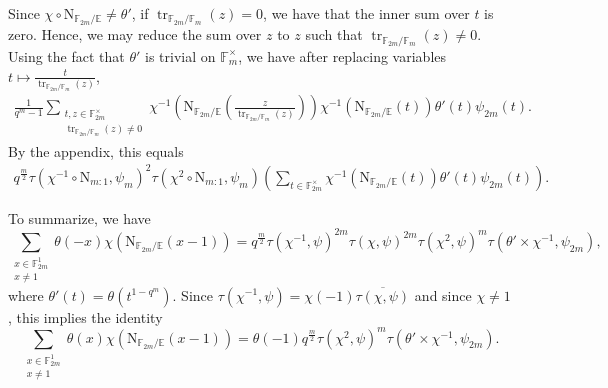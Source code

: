 \documentclass[12pt, reqno]{amsart}
\theoremstyle{definition}
\theoremstyle{definition}
\theoremstyle{definition}
\newcommand{\multiplicativegroup}[1]{#1^{\times}}
\newcommand{\conjugate}[1]{\overline{#1}}
\newcommand{\fieldCharacter}{\psi}
\newcommand{\trace}{\operatorname{tr}}
\newcommand{\FieldNorm}[2]{\mathrm{N}_{#1:#2}}
\newcommand{\aFieldNorm}{\mathrm{N}}
\newcommand{\finiteField}{\mathbb{F}}
\newcommand{\quadraticExtension}{\mathbb{E}}
\newcommand{\finiteFieldExtension}[1]{\finiteField_{#1}}
\begin{document}
Since $\chi \circ \aFieldNorm_{\finiteFieldExtension{2m} \slash \quadraticExtension} \ne \theta'$, if $\trace_{\finiteFieldExtension{2m} \slash \finiteFieldExtension{m}}\left(z\right) = 0$, we have that the inner sum over $t$ is zero. Hence, we may reduce the sum over $z$ to $z$ such that $\trace_{\finiteFieldExtension{2m} \slash \finiteFieldExtension{m}}\left(z\right) \ne 0$. Using the fact that $\theta'$ is trivial on $\multiplicativegroup{\finiteFieldExtension{m}}$, we have after replacing variables $t \mapsto \frac{t}{\trace_{\finiteFieldExtension{2m} \slash \finiteFieldExtension{m}}\left(z\right)}$,
\begin{align*}
	\frac{1}{q^m-1}\sum_{\substack{t,z \in \multiplicativegroup{\finiteFieldExtension{2m}}\\
	\trace_{\finiteFieldExtension{2m} \slash \finiteFieldExtension{m}}\left(z\right) \ne 0}} \chi^{-1}\left(\aFieldNorm_{\finiteFieldExtension{2m} \slash \quadraticExtension}\left(\frac{z}{\trace_{\finiteFieldExtension{2m} \slash \finiteFieldExtension{m}}\left(z\right) }\right)\right) \chi^{-1}\left(\aFieldNorm_{\finiteFieldExtension{2m} \slash \quadraticExtension}\left(t\right)\right) \theta' \left(t\right) \fieldCharacter_{2m}\left(t\right).
\end{align*}
By the appendix, this equals
\begin{align*}
	q^{\frac{m}{2}} \tau\left(\chi^{-1} \circ \FieldNorm{m}{1}, \fieldCharacter_m\right)^2 \tau\left(\chi^{2} \circ \FieldNorm{m}{1}, \fieldCharacter_m\right) \left(\sum_{t \in \multiplicativegroup{\finiteFieldExtension{2m}}} \chi^{-1}\left(\aFieldNorm_{\finiteFieldExtension{2m} \slash \quadraticExtension}\left(t\right)\right) \theta' \left(t\right) \fieldCharacter_{2m}\left(t\right)\right).
\end{align*}

To summarize, we have
$$\sum_{\substack{x \in \finiteFieldExtension{2m}^1\\
		x \ne 1}} \theta \left(-x\right) \chi\left(\aFieldNorm_{\finiteFieldExtension{2m} \slash \quadraticExtension}\left(x - 1\right)\right) = q^{\frac{m}{2}} \tau\left(\chi^{-1}, \fieldCharacter\right)^{2m} \tau\left(\chi, \fieldCharacter\right)^{2m} \tau\left(\chi^{2}, \fieldCharacter\right)^m \tau\left(\theta' \times \chi^{-1}, \fieldCharacter_{2m}\right),$$
	where $\theta'\left(t\right) = \theta\left(t^{1-q^m}\right)$.
Since $\tau\left(\chi^{-1}, \fieldCharacter\right) = \chi\left(-1\right) \conjugate{\tau\left(\chi, \fieldCharacter\right)}$ and since $\chi \ne 1$, this implies the identity
$$\sum_{\substack{x \in \finiteFieldExtension{2m}^1\\
		x \ne 1}} \theta \left(x\right) \chi\left(\aFieldNorm_{\finiteFieldExtension{2m} \slash \quadraticExtension}\left(x - 1\right)\right) = \theta\left(-1\right) q^{\frac{m}{2}} \tau\left(\chi^{2}, \fieldCharacter\right)^m \tau\left(\theta' \times \chi^{-1}, \fieldCharacter_{2m}\right).$$
\end{document}
